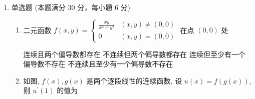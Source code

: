 \begin{enumerate}
{\begin{enumerate}
	\item
	$2$。由 $y(0)=y^{\prime}(0)=0$ 及方程得
	$y^{\prime\prime}(0)=e^{0}-2y^{\prime}(0)-y(0)=1$，故 Taylor 展开
	$y(x)=\frac{y^{\prime\prime}(0)}{2}x^{2}+o\left(x^{2}\right)=\frac{x^{2}}{2}+o\left(x^{2}\right)$。
	又 $\ln\left(1+x^{2}\right)\sim x^{2}$，所以极限 $=\dfrac{x^{2}}{x^{2}/2}=2$。

	\item
	$\pm4$。记 $A=\int_0^2f(x)dx$（常数）。由 $f^{\prime}(x)A=8$ 知
	$f^{\prime}(x)=\frac{8}{A}$ 为常数，结合 $f(0)=0$ 得 $f(x)=\frac{8}{A}x$。代回
	\[
	A=\int_0^2\frac{8}{A}x\,dx=\frac{8}{A}\cdot2=\frac{16}{A}
	\quad\Longrightarrow\quad A^{2}=16,\quad A=\pm4 .
	\]

	\item
	$1$。两次分部积分：
	\[
	\int_0^{\pi}f^{\prime\prime}\sin x\,dx
	=\bigl[f^{\prime}\sin x\bigr]_0^{\pi}-\int_0^{\pi}f^{\prime}\cos x\,dx
	=-\bigl[f\cos x\bigr]_0^{\pi}-\int_0^{\pi}f\sin x\,dx .
	\]
	故 $\int_0^{\pi}\left(f+f^{\prime\prime}\right)\sin x\,dx=-\bigl[f\cos x\bigr]_0^{\pi}
	=f(\pi)+f(0)$。由 $f(\pi)+f(0)=3$、$f(\pi)=2$ 得 $f(0)=1$。

	\item
	$y=-\frac34x+1$。过 $(0,1)$ 的直线设为 $f(x)=kx+1$，则
	\[
	I(k)=\int_0^2\left[x^{2}-(kx+1)^{2}\right]dx
	=\frac83\left(1-k^{2}\right)-4k-2 .
	\]
	由 $I^{\prime}(k)=-\frac{16}{3}k-4=0$ 得 $k=-\frac34$；
	又 $I^{\prime\prime}(k)=-\frac{16}{3}<0$，故为最大值点，所求直线为 $y=-\frac34x+1$。
\end{enumerate}
}

\item 
单选题 (本题满分 30 分，每小题 6 分)
\begin{enumerate}
	\item
	二元函数 $f(x, y)=\left\{\begin{array}{ll}\frac{x y}{x^{2}+y^{2}} & (x, y) \neq(0,0) \\ 0 & (x, y)=(0,0)\end{array}\right.$ 在点 $(0,0)$ 处  
	
\fourchoices
{连续且两个偏导数都存在}
{不连续但两个偏导数都存在}
{连续但至少有一个偏导数不存在}
{不连续且至少有一个偏导数不存在}

\item 
如图, $f(x), g(x)$ 是两个逐段线性的连续函数, 设 $u(x)=f(g(x))$, 则 $u^{\prime}(1)$ 的值为  
\begin{figure}[h!]
	\centering
	
\end{figure}


\end{enumerate}
\end{enumerate}
